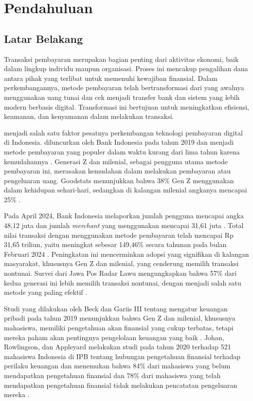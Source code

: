 \chapter{Pendahuluan}
\label{chapter:pendahuluan}

\section{Latar Belakang}
\label{sec:latarbelakang}

Transaksi pembayaran merupakan bagian penting dari aktivitas ekonomi, baik dalam lingkup individu maupun organisasi. Proses ini mencakup pengalihan dana antara pihak yang terlibat untuk memenuhi kewajiban finansial. Dalam perkembangannya, metode pembayaran telah bertransformasi dari yang awalnya menggunakan uang tunai dan cek menjadi transfer bank dan sistem yang lebih modern berbasis digital. Transformasi ini bertujuan untuk meningkatkan efisiensi, keamanan, dan kenyamanan dalam melakukan transaksi.

\qrisfull{} menjadi salah satu faktor pesatnya perkembangan teknologi pembayaran digital di Indonesia. \qris{} diluncurkan oleh Bank Indonesia pada tahun 2019 dan menjadi metode pembayaran yang populer dalam waktu kurang dari lima tahun karena kemudahannya \parencite{qris}. Generasi Z dan milenial, sebagai pengguna utama metode pembayaran ini, merasakan kemudahan dalam melakukan pembayaran atau pengeluaran uang. Goodstats menunjukkan bahwa 38\% Gen Z menggunakan \qris{} dalam kehidupan sehari-hari, sedangkan di kalangan milenial angkanya mencapai
25\% \parencite{qris2023goodstats}.

Pada April 2024, Bank Indonesia melaporkan jumlah pengguna \qris{} mencapai angka 48,12 juta dan jumlah \emph{merchant} yang menggunakan mencapai 31,61 juta \parencite{CNNqris2024}. Total nilai transaksi dengan menggunakan metode pembayaran \qris{} telah mencapai Rp 31,65 triliun, yaitu meningkat sebesar 149,46\% secara tahunan pada bulan Februari 2024 \parencite{Tempo2024BIQRIS}. Peningkatan ini mencerminkan adopsi yang signifikan di kalangan masyarakat, khususnya Gen Z dan milenial, yang cenderung memilih transaksi nontunai. Survei dari Jawa Pos Radar Lawu mengungkapkan bahwa 57\% dari kedua generasi ini lebih memilih transaksi nontunai, dengan \qris{} menjadi salah satu metode yang paling efektif \parencite{jawapos2024qris}.

Studi yang dilakukan oleh Beck dan Gariis III tentang mengatur keuangan pribadi pada tahun 2019 menunjukkan bahwa Gen Z dan milenial, khususnya mahasiswa, memiliki pengetahuan akan finansial yang cukup terbatas, tetapi mereka paham akan pentingnya pengelolaan keuangan yang baik \parencite{beck2019managing}. Johan, Rowlingson, dan Appleyard melakukan studi pada tahun 2020 terhadap 521 mahasiswa Indonesia di IPB tentang hubungan pengetahuan finansial terhadap perilaku keuangan dan menemukan bahwa 84\% dari mahasiswa yang belum mendapatkan pengetahuan finansial dan 78\% dari mahasiswa yang telah mendapatkan pengetahuan finansial tidak melakukan pencatatan pengeluaran mereka \parencite{johan2021effect}. 

